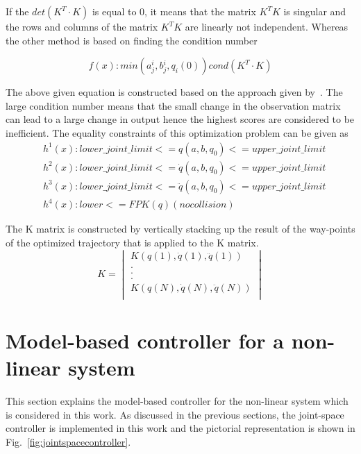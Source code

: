 \begin{flushleft}
If the $det(K^T\cdot K)$ is equal to 0, it means that the matrix $K^TK$ is singular and the rows and columns of the matrix $K^TK$ are linearly not independent. Whereas the other method is based on finding the condition number
\end{flushleft}

\begin{equation}
f(x) : min(a{_j^i}, b{_j^i}, q_i(0)) cond(K^T\cdot K)
\end{equation}

The above given equation is constructed based on the approach given by~\cite{vantilt2015optimal}\cite{swevers}. The large condition number means that the small change in the observation matrix can lead to a large change in output hence the highest scores are considered to be inefficient. The equality constraints of this optimization problem can be given as
\begin{align*}
& h^1(x) : lower\_joint\_limit <= q(a, b, q_0) <= upper\_joint\_limit \\
& h^2(x) : lower\_joint\_limit <= \dot{q}(a, b, q_0) <= upper\_joint\_limit \\
& h^3(x) : lower\_joint\_limit <= \ddot{q}(a, b, q_0) <= upper\_joint\_limit \\
& h^4(x) : lower <= FPK(q) (no collision)
\end{align*}

The K matrix is constructed by vertically stacking up the result of the way-points of the optimized trajectory that is applied to the K matrix. 
\begin{equation}
K = \begin{vmatrix}
K(q(1), \dot{q}(1), \ddot{q}(1)) \\
.\\
.\\
.\\
K(q(N), \dot{q}(N), \ddot{q}(N)) \\
\end{vmatrix}
\end{equation}

\newpage

\section{Model-based controller for a non-linear system}

This section explains the model-based controller for the non-linear system which is considered in this work. As discussed in the previous sections, the joint-space controller is implemented in this work and the pictorial representation is shown in Fig.~\ref{fig:jointspacecontroller}.

